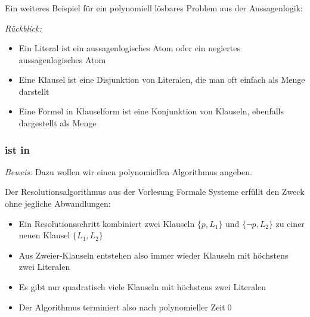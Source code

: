 \documentclass[aspectratio=1610,onlymath]{beamer}
\begin{document}
\begin{frame}\frametitle{}

Ein weiteres Beispiel für ein polynomiell lösbares Problem aus der Aussagenlogik:
\bigskip

\emph{Rückblick:}
\begin{itemize}
\item Ein \alert{Literal} ist ein aussagenlogisches Atom oder ein negiertes aussagenlogisches Atom
\item Eine \alert{Klausel} ist eine Disjunktion von Literalen, die man oft einfach als Menge darstellt
\item Eine Formel in \alert{Klauselform} ist eine Konjunktion von Klauseln,
ebenfalls dargestellt als Menge
\end{itemize}\pause


\end{frame}

\begin{frame}\frametitle{ ist in }


\pause\emph{Beweis:} Dazu wollen wir einen polynomiellen Algorithmus angeben.
\pause\bigskip

Der Resolutionsalgorithmus aus der Vorlesung Formale Systeme erfüllt den Zweck ohne jegliche Abwandlungen:
\begin{itemize}
\item Ein Resolutionsschritt kombiniert zwei Klauseln $\{p,L_1\}$ und $\{\neg p,L_2\}$
zu einer neuen Klausel $\{L_1,L_2\}$
\item Aus Zweier-Klauseln entstehen also immer wieder Klauseln mit höchstens zwei Literalen
\item Es gibt nur quadratisch viele Klauseln mit höchstens zwei Literalen
\item Der Algorithmus terminiert also nach polynomieller Zeit\qed
\end{itemize}

\end{frame}

\end{document}
